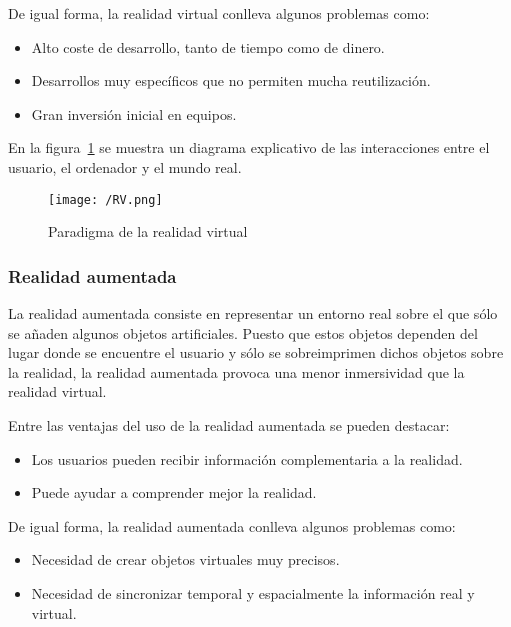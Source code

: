 De igual forma, la realidad virtual conlleva algunos problemas como:

\begin{itemize}
  \item Alto coste de desarrollo, tanto de tiempo como de dinero.
  \item Desarrollos muy específicos que no permiten mucha reutilización.
  \item Gran inversión inicial en equipos.
\end{itemize}

En la figura~\ref{fig:rv} se muestra un diagrama explicativo de las interacciones entre el usuario,
el ordenador y el mundo real.

\begin{figure}[!h]
  \begin{center}
    \texttt{[image: /RV.png]}
    \caption{Paradigma de la realidad virtual}
    \label{fig:rv}
  \end{center}
\end{figure}

\subsubsection{Realidad aumentada}

La realidad aumentada consiste en representar un entorno real sobre el que sólo se añaden algunos
objetos artificiales. Puesto que estos objetos dependen del lugar donde se encuentre el usuario y
sólo se sobreimprimen dichos objetos sobre la realidad, la realidad aumentada provoca una menor
inmersividad que la realidad virtual.

Entre las ventajas del uso de la realidad aumentada se pueden destacar:

\begin{itemize}
  \item Los usuarios pueden recibir información complementaria a la realidad.
  \item Puede ayudar a comprender mejor la realidad.
\end{itemize}

De igual forma, la realidad aumentada conlleva algunos problemas como:

\begin{itemize}
  \item Necesidad de crear objetos virtuales muy precisos.
  \item Necesidad de sincronizar temporal y espacialmente la información real y virtual.
\end{itemize}

